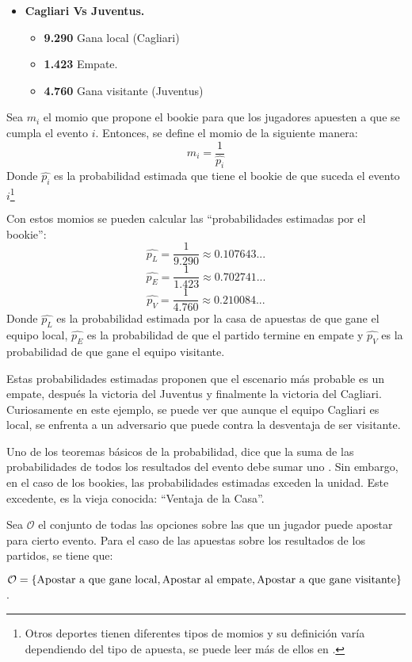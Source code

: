 \begin{enumerate}
\begin{itemize}
 \item \textbf{Cagliari Vs Juventus.}
  \begin{itemize}
    \item \textbf{9.290} Gana local (Cagliari)
    \item \textbf{1.423} Empate.
    \item \textbf{4.760} Gana visitante (Juventus)
  \end{itemize}
 \end{itemize}

  Sea $m_i$ el momio que propone el bookie para que los jugadores apuesten a que se cumpla el evento $i$. Entonces, se define el momio de la siguiente manera:
 \[m_i = \frac{1}{\hat{p_i}}\]
 Donde $\hat{p_i}$ es la probabilidad estimada que tiene el bookie de que suceda el evento $i$\footnote{Otros deportes tienen diferentes tipos de momios y su definición varía dependiendo del tipo de apuesta, se puede leer más de ellos en \cite{ignatin1984sports}.}

 Con estos momios se pueden calcular las ``probabilidades estimadas por el bookie'':
 \[\hat{p_L} = \frac{1}{9.290} \approx 0.107643...\] 
 \[\hat{p_E} = \frac{1}{1.423} \approx 0.702741...\]
 \[\hat{p_V} = \frac{1}{4.760} \approx 0.210084...\]
 Donde $\hat{p_L}$ es la probabilidad estimada por la casa de apuestas de que gane el equipo local, $\hat{p_E}$ es la probabilidad de que el partido termine en empate y $\hat{p_V}$ es la probabilidad de que gane el equipo visitante.
 
 Estas probabilidades estimadas proponen que el escenario más probable es un empate, después la victoria del Juventus y finalmente la victoria del Cagliari. Curiosamente en este ejemplo, se puede ver que aunque el equipo Cagliari es local, se enfrenta a un adversario que puede contra la desventaja de ser visitante.

 Uno de los teoremas básicos de la probabilidad, dice que la suma de las probabilidades de todos los resultados del evento debe sumar uno \cite{ross2006first}. Sin embargo, en el caso de los bookies, las probabilidades estimadas exceden la unidad. Este excedente, es la vieja conocida: ``Ventaja de la Casa''.

 Sea $\mathcal{O}$ el conjunto de todas las opciones sobre las que un jugador puede apostar para cierto evento. Para el caso de las apuestas sobre los resultados de los partidos, se tiene que: 
 
 $\mathcal{O} = \{\text{Apostar a que gane local}, \\ 
 \text{Apostar al empate}, \\
 \text{Apostar a que gane visitante}\}$.


\end{enumerate}

